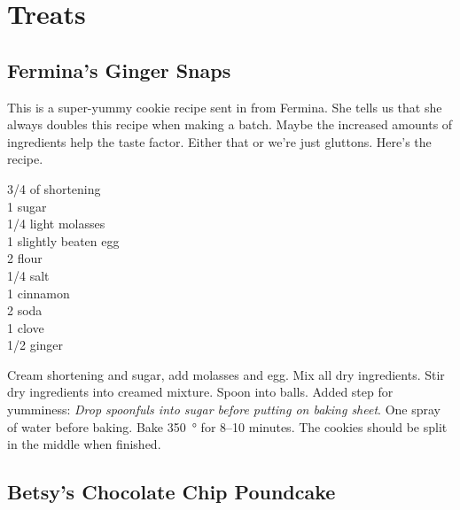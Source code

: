 \chapter{Treats}

\section{Fermina's Ginger Snaps}

\begin{open}
  This is a super-yummy cookie recipe sent in from Fermina.  She tells us that
  she always doubles this recipe when making a batch. Maybe the increased
  amounts of ingredients help the taste factor.  Either that or we're just
  gluttons.  Here's the recipe.
\end{open}
\begin{ingredients}
  \SI{3/4}{\cup} of shortening \\
  \SI{1}{\cup} sugar \\
  \SI{1/4}{\cup} light molasses \\
  1 slightly beaten egg \\
  \SI{2}{\cup} flour \\
  \SI{1/4}{\teaspoon}  salt \\
  \SI{1}{\teaspoon}  cinnamon \\
  \SI{2}{\teaspoon} soda \\
  \SI{1}{\teaspoon}  clove \\
  \SI{1/2}{\teaspoon} ginger
\end{ingredients}
Cream shortening and sugar, add molasses and egg.  Mix all dry ingredients.
Stir dry ingredients into creamed mixture.  Spoon into balls. Added step for
yumminess: \textit{Drop spoonfuls into sugar before putting on baking sheet}.
One spray of water before baking.  Bake \SI{350}{\degree} for \numrange{8}{10}
minutes.  The cookies should be split in the middle when finished.

\section{Betsy's Chocolate Chip Poundcake}

